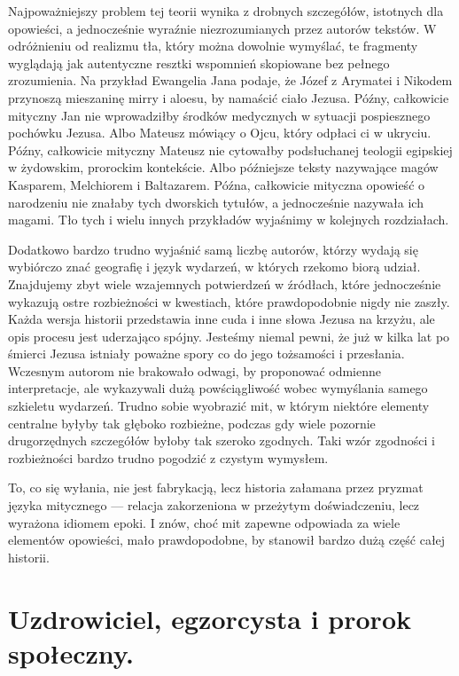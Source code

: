 Najpoważniejszy problem tej teorii wynika z drobnych szczegółów, istotnych dla opowieści, a jednocześnie wyraźnie niezrozumianych przez autorów tekstów.
W odróżnieniu od realizmu tła, który można dowolnie wymyślać, te fragmenty wyglądają jak autentyczne resztki wspomnień skopiowane bez pełnego zrozumienia.
Na przykład Ewangelia Jana podaje, że Józef z Arymatei i Nikodem przynoszą mieszaninę mirry i aloesu, by namaścić ciało Jezusa.
Późny, całkowicie mityczny Jan nie wprowadziłby środków medycznych w sytuacji pospiesznego pochówku Jezusa.
Albo Mateusz mówiący o Ojcu, który odpłaci ci w ukryciu.
Późny, całkowicie mityczny Mateusz nie cytowałby podsłuchanej teologii egipskiej w żydowskim, prorockim kontekście.
Albo późniejsze teksty nazywające magów Kasparem, Melchiorem i Baltazarem.
Późna, całkowicie mityczna opowieść o narodzeniu nie znałaby tych dworskich tytułów, a jednocześnie nazywała ich magami.
Tło tych i wielu innych przykładów wyjaśnimy w kolejnych rozdziałach.

Dodatkowo bardzo trudno wyjaśnić samą liczbę autorów, którzy wydają się wybiórczo znać geografię i język wydarzeń, w których rzekomo biorą udział.
Znajdujemy zbyt wiele wzajemnych potwierdzeń w źródłach, które jednocześnie wykazują ostre rozbieżności w kwestiach, które prawdopodobnie nigdy nie zaszły.
Każda wersja historii przedstawia inne cuda i inne słowa Jezusa na krzyżu, ale opis procesu jest uderzająco spójny.
Jesteśmy niemal pewni, że już w kilka lat po śmierci Jezusa istniały poważne spory co do jego tożsamości i przesłania.
Wczesnym autorom nie brakowało odwagi, by proponować odmienne interpretacje, ale wykazywali dużą powściągliwość wobec wymyślania samego szkieletu wydarzeń.
Trudno sobie wyobrazić mit, w którym niektóre elementy centralne byłyby tak głęboko rozbieżne, podczas gdy wiele pozornie drugorzędnych szczegółów byłoby tak szeroko zgodnych.
Taki wzór zgodności i rozbieżności bardzo trudno pogodzić z czystym wymysłem.

To, co się wyłania, nie jest fabrykacją, lecz historia załamana przez pryzmat języka mitycznego — relacja zakorzeniona w przeżytym doświadczeniu, lecz wyrażona idiomem epoki.
I znów, choć mit zapewne odpowiada za wiele elementów opowieści, mało prawdopodobne, by stanowił bardzo dużą część całej historii.

\section{Uzdrowiciel, egzorcysta i prorok społeczny.}\label{sec:healer}

